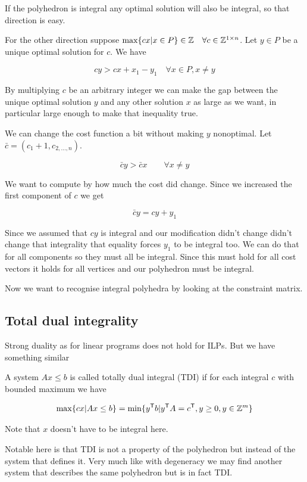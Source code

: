\begin{pr} If the polyhedron is integral any optimal solution will also be integral, so that direction is easy.

For the other direction suppose $\max \{cx | x\in P\}\in \mathbb{Z}\quad \forall c\in \mathbb{Z}^{1\times n}$. Let $y\in P$ be a unique optimal solution for $c$. We have 

\[cy>cx + x_1 -y_1 \quad \forall x\in P,x\neq y\]

By multiplying $c$ be an arbitrary integer we can make the gap between the unique optimal solution $y$ and any other solution $x$ as large as we want, in particular large enough to make that inequality true.

We can change the cost function a bit without making $y$ nonoptimal. Let $\bar c = (c_1+1,c_{2,\ldots,n})$. 

\[\bar c y > \bar c x\qquad \forall x\neq y\]

We want to compute by how much the cost did change. Since we increased the first component of $c$ we get

\[\bar c y = cy+y_1\]

Since we assumed that $cy$ is integral and our modification didn't change didn't change that integrality that equality forces $y_1$ to be integral too. We can do that for all components so they must all be integral. Since this must hold for all cost vectors it holds for all vertices and our polyhedron must be integral.
\end{pr}

Now we want to recognise integral polyhedra by looking at the constraint matrix. 

\subsection{Total dual integrality}

Strong duality as for linear programs does not hold for ILPs. But we have something similar

\begin{Def} A system $Ax\leq b$ is called totally dual integral (TDI) if for each integral $c$ with bounded maximum we have

\[\max \{cx |Ax\leq b\} = \min \{{y}^\text{\upshape \sffamily T} b | {y}^\text{\upshape \sffamily T} A = {c}^\text{\upshape \sffamily T}, y\geq 0, y\in \mathbb{Z}^m\}\]

Note that $x$ doesn't have to be integral here.
\end{Def}

Notable here is that TDI is not a property of the polyhedron but instead of the system that defines it. Very much like with degeneracy we may find another system that describes the same polyhedron but is in fact TDI.

